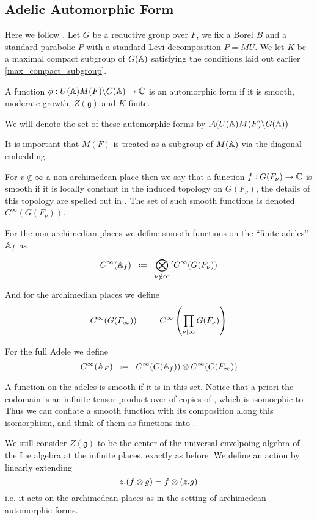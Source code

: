 \subsection{Adelic Automorphic Form}
Here we follow \cite[I.2.17]{moeglinSpectralDecompositionEisenstein1995}. Let \(G\) be a reductive group over \(F\), we fix a Borel \(B\) and a standard parabolic \(P \) with a standard Levi decomposition \(P = MU\). We let \(K\) be a maximal compact subgroup of \(G(\A)\) satisfying the conditions laid out earlier \ref{max_compact_subgroup}.
\begin{definition}
    A function \(\phi: U(\A)M(F)\backslash G(\A) \to \C\) is an automorphic form if it is smooth, moderate growth, \(Z(\mathfrak{g})\) and \(K\) finite. 

	We will denote the set of these automorphic forms by \(\mathcal{A}(U(\A)M(F)\backslash G(\A))\)
\end{definition}

\begin{remark}
    It is important that \(M(F)\) is treated as a subgroup of \(M(\A)\) via the diagonal embedding.
\end{remark}

For \(v\notin \infty\) a non-archimedean place then we say that a function \(f: G(F_\nu) \to \C\) is smooth if it is locally constant in the induced topology on \(G(F_\nu)\), the details of this topology are spelled out in \cite{conradWeilGrothendieckApproaches2012}. The set of such smooth functions is denoted \(C^\infty(G(F_\nu))\).
	
	For the non-archimedian places we define smooth functions on the ``finite adeles'' \(\A_f\) as 
	\[C^\infty(\mathbb{A}_f) \defeq \bigotimes^{}_{\nu \notin \infty} \phantom{}' C^\infty(G(F_\nu)) \]
	
	And for the archimedian places we define
	\[C^\infty(G(F_\infty)) \defeq C^\infty\left(\prod_{\nu|\infty} G(F_\nu)\right)\]
	
	For the full Adele we define 
	\[C^\infty(\mathbb{A}_F) \defeq   C^\infty(G(\mathbb{A}_f))   \otimes   C^\infty(G(F_\infty))\]
	
	A function on the adeles is smooth if it is in this set. Notice that a priori the codomain is an infinite tensor product over \C of copies of \C, which is isomorphic to \C. Thus we can conflate a smooth function with its composition along this isomorphism, and think of them as functions into \C.

    We still consider \(Z(\mathfrak{g})\) to be the center of the universal envelpoing algebra of the Lie algebra at the infinite places, exactly as before. We define an action by linearly extending
    \[z.(f\otimes g) = f\otimes (z.g)\]
    i.e. it acts on the archimedean places as in the setting of archimedean automorphic forms. 
	
